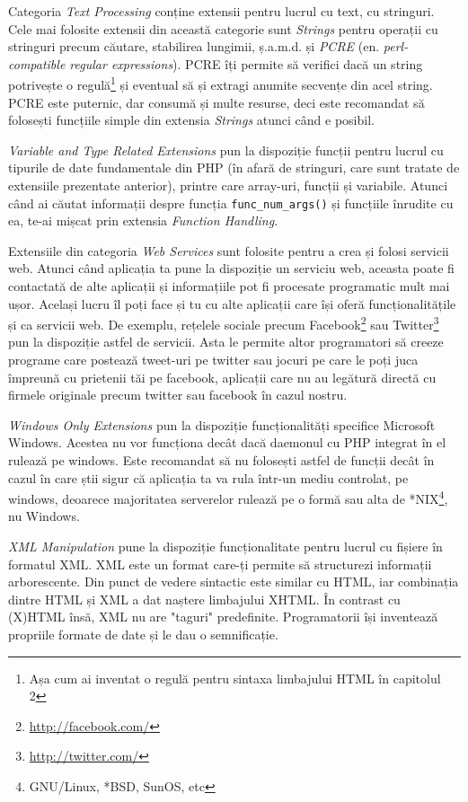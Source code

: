 Categoria \textit{Text Processing} conține extensii pentru
lucrul cu text, cu stringuri. Cele mai folosite extensii
din această categorie sunt \textit{Strings} pentru operații
cu stringuri precum căutare, stabilirea lungimii, ș.a.m.d.
și \textit{PCRE} (en. \textsl{perl-compatible regular expressions}).
PCRE îți permite să verifici dacă un string potrivește o
regulă\footnote{Așa cum ai inventat o regulă pentru
sintaxa limbajului HTML în capitolul 2} și eventual
să și extragi anumite secvențe din acel string.\\
PCRE este puternic, dar consumă și multe resurse,
deci este recomandat să folosești funcțiile simple
din extensia \textit{Strings} atunci când e posibil.

\textit{Variable and Type Related Extensions} pun
la dispoziție funcții pentru lucrul cu tipurile
de date fundamentale din PHP (în afară de stringuri,
care sunt tratate de extensiile prezentate anterior), printre
care array-uri, funcții și variabile. Atunci când ai căutat
informații despre funcția \texttt{func\_num\_args()}
și funcțiile înrudite cu ea, te-ai mișcat prin extensia
\textit{Function Handling}.

Extensiile din categoria \textit{Web Services} sunt folosite
pentru a crea și folosi servicii web. Atunci când aplicația
ta pune la dispoziție un serviciu web, aceasta poate
fi contactată de alte aplicații și informațiile pot
fi procesate programatic mult mai ușor. Același lucru îl
poți face și tu cu alte aplicații care își oferă
funcționalitățile și ca servicii web. De exemplu,
rețelele sociale precum Facebook\footnote{\url{http://facebook.com/}}
sau Twitter\footnote{\url{http://twitter.com/}} pun la dispoziție
astfel de servicii. Asta le permite altor programatori să
creeze programe care postează tweet-uri pe twitter sau
jocuri pe care le poți juca împreună cu prietenii tăi
pe facebook, aplicații care nu au legătură directă
cu firmele originale precum twitter sau facebook în
cazul nostru.

\textit{Windows Only Extensions} pun la dispoziție funcționalități
specifice Microsoft Windows. Acestea nu vor funcționa decât dacă
daemonul cu PHP integrat în el rulează pe windows.
Este recomandat să nu folosești astfel de funcții
decât în cazul în care știi sigur că aplicația ta
va rula într-un mediu controlat, pe windows, deoarece
majoritatea serverelor rulează pe o formă sau alta
de *NIX\footnote{GNU/Linux, *BSD, SunOS, etc}, nu Windows.

\textit{XML Manipulation} pune la dispoziție funcționalitate
pentru lucrul cu fișiere în formatul XML. XML este un format
care-ți permite să structurezi informații arborescente. Din punct
de vedere sintactic este
similar cu HTML, iar combinația dintre HTML și XML a dat naștere
limbajului XHTML. În contrast cu (X)HTML însă, XML nu are
"taguri" predefinite. Programatorii își inventează
propriile formate de date și le dau o semnificație.


